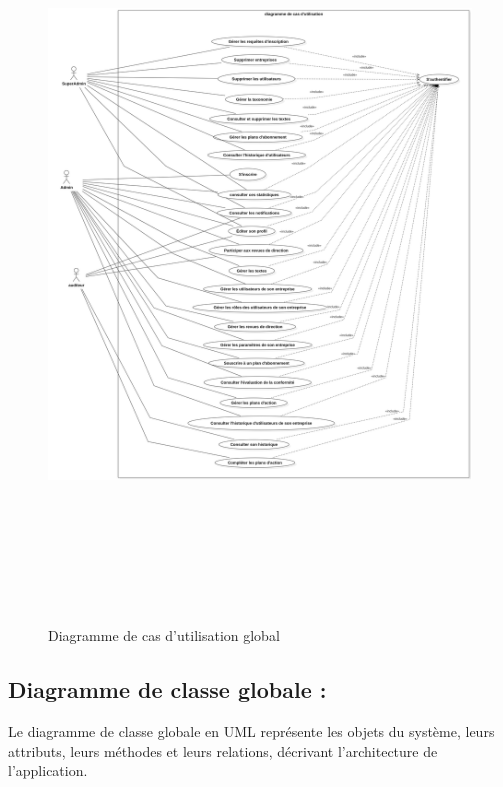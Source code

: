 \begin{figure}[H]
    \centering
    \includegraphics[width=18cm,height=20cm]{images/UseCaseDiagram.png}
    \caption{Diagramme de cas d'utilisation global}
\end{figure}

\subsection{Diagramme de classe globale :}

\noindent Le diagramme de classe globale en UML représente les objets du système, leurs attributs, leurs méthodes et leurs relations, décrivant l'architecture de l'application.

